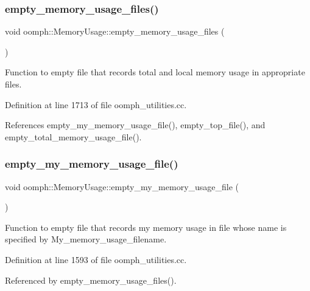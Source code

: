 \subsubsection{\texorpdfstring{empty\+\_\+memory\+\_\+usage\+\_\+files()}{empty\_memory\_usage\_files()}}
{\footnotesize\ttfamily void oomph\+::\+Memory\+Usage\+::empty\+\_\+memory\+\_\+usage\+\_\+files (\begin{DoxyParamCaption}{ }\end{DoxyParamCaption})}



Function to empty file that records total and local memory usage in appropriate files. 



Definition at line 1713 of file oomph\+\_\+utilities.\+cc.



References empty\+\_\+my\+\_\+memory\+\_\+usage\+\_\+file(), empty\+\_\+top\+\_\+file(), and empty\+\_\+total\+\_\+memory\+\_\+usage\+\_\+file().

\mbox{\label{namespaceoomph_1_1MemoryUsage_aadcb42d5c4ca8099981d75b2d5adcd96}} 
\subsubsection{\texorpdfstring{empty\+\_\+my\+\_\+memory\+\_\+usage\+\_\+file()}{empty\_my\_memory\_usage\_file()}}
{\footnotesize\ttfamily void oomph\+::\+Memory\+Usage\+::empty\+\_\+my\+\_\+memory\+\_\+usage\+\_\+file (\begin{DoxyParamCaption}{ }\end{DoxyParamCaption})}



Function to empty file that records my memory usage in file whose name is specified by My\+\_\+memory\+\_\+usage\+\_\+filename. 



Definition at line 1593 of file oomph\+\_\+utilities.\+cc.



Referenced by empty\+\_\+memory\+\_\+usage\+\_\+files().

\mbox{\label{namespaceoomph_1_1MemoryUsage_a0034019640ac5f6ffe7e8e40fae1e453}} 
